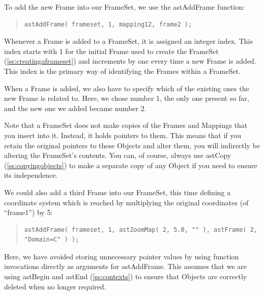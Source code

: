 \documentclass[twoside,11pt]{article}
\newcommand{\htmlref}[2]{#1}
\newcommand{\secref}[1]{\S\ref{#1}}
\renewcommand{\secref}[1]{\ref{#1}}
\begin{document}
To add the new Frame into our FrameSet, we use the \htmlref{astAddFrame}{astAddFrame}
function:

\begin{quote}
\small
\begin{verbatim}
astAddFrame( frameset, 1, mapping12, frame2 );
\end{verbatim}
\normalsize
\end{quote}

Whenever a Frame is added to a FrameSet, it is assigned an integer
index. This index starts with 1 for the initial Frame used to create
the FrameSet (\secref{ss:creatingaframeset}) and increments by one
every time a new Frame is added. This index is the primary way of
identifying the Frames within a FrameSet.

When a Frame is added, we also have to specify which of the existing
ones the new Frame is related to. Here, we chose number 1, the only
one present so far, and the new one we added became number 2.

Note that a FrameSet does not make copies of the Frames and Mappings
that you insert into it. Instead, it holds pointers to them. This
means that if you retain the original pointers to these Objects and
alter them, you will indirectly be altering the FrameSet's
contents. You can, of course, always use \htmlref{astCopy}{astCopy}
(\secref{ss:copyingobjects}) to make a separate copy of any \htmlref{Object}{Object} if
you need to ensure its independence.

We could also add a third Frame into our FrameSet, this time defining
a coordinate system which is reached by multiplying the original
coordinates (of ``frame1'') by 5:

\begin{quote}
\small
\begin{verbatim}
astAddFrame( frameset, 1, astZoomMap( 2, 5.0, "" ), astFrame( 2, "Domain=C" ) );
\end{verbatim}
\normalsize
\end{quote}

Here, we have avoided storing unnecessary pointer values by using
function invocations directly as arguments for astAddFrame. This
assumes that we are using \htmlref{astBegin}{astBegin} and \htmlref{astEnd}{astEnd} (\secref{ss:contexts}) to
ensure that Objects are correctly deleted when no longer required.
\end{document}
